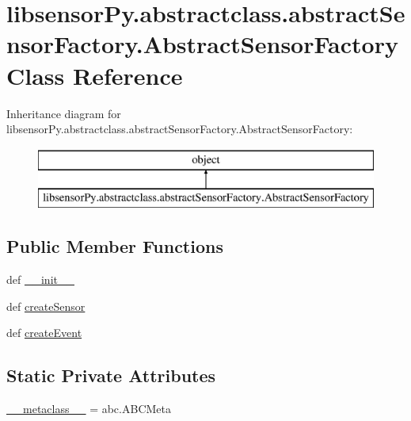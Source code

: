 \hypertarget{classlibsensorPy_1_1abstractclass_1_1abstractSensorFactory_1_1AbstractSensorFactory}{}\section{libsensor\+Py.\+abstractclass.\+abstract\+Sensor\+Factory.\+Abstract\+Sensor\+Factory Class Reference}
\label{classlibsensorPy_1_1abstractclass_1_1abstractSensorFactory_1_1AbstractSensorFactory}
Inheritance diagram for libsensor\+Py.\+abstractclass.\+abstract\+Sensor\+Factory.\+Abstract\+Sensor\+Factory\+:\begin{figure}[H]
\begin{center}
\leavevmode
\includegraphics[height=2.000000cm]{classlibsensorPy_1_1abstractclass_1_1abstractSensorFactory_1_1AbstractSensorFactory}
\end{center}
\end{figure}
\subsection*{Public Member Functions}
\begin{DoxyCompactItemize}
\item 
def \hyperlink{classlibsensorPy_1_1abstractclass_1_1abstractSensorFactory_1_1AbstractSensorFactory_a8e7f8654d1acec170cb2d70e1fa7c10a}{\+\_\+\+\_\+init\+\_\+\+\_\+}
\item 
def \hyperlink{classlibsensorPy_1_1abstractclass_1_1abstractSensorFactory_1_1AbstractSensorFactory_ae615807cecea64991a406f373dbb86dc}{create\+Sensor}
\item 
def \hyperlink{classlibsensorPy_1_1abstractclass_1_1abstractSensorFactory_1_1AbstractSensorFactory_afb1e76810b3f9a6970295ecbc75d5cd6}{create\+Event}
\end{DoxyCompactItemize}
\subsection*{Static Private Attributes}
\begin{DoxyCompactItemize}
\item 
\hyperlink{classlibsensorPy_1_1abstractclass_1_1abstractSensorFactory_1_1AbstractSensorFactory_aae483f8787e962f3936962e656594fa1}{\+\_\+\+\_\+metaclass\+\_\+\+\_\+} = abc.\+A\+B\+C\+Meta
\end{DoxyCompactItemize}


